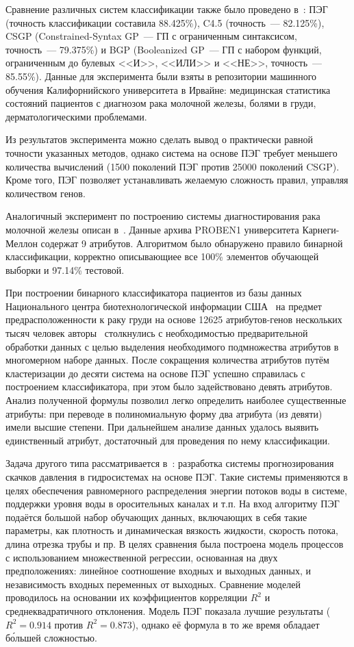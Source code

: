 Сравнение различных систем классификации также было проведено в~\cite{conf/adma/WeinertL06}: ПЭГ (точность классификации составила 88.425\%), {C4.5} (точность~--- 82.125\%), CSGP (Constrained-Syntax GP~--- ГП с ограниченным синтаксисом, точность~--- 79.375\%) и BGP (Booleanized GP~--- ГП с набором функций, ограниченным до булевых <<И>>, <<ИЛИ>> и <<НЕ>>, точность~--- 85.55\%). Данные для эксперимента были взяты в репозитории машинного обучения Калифорнийского университета в Ирвайне: медицинская статистика состояний пациентов с диагнозом рака молочной железы, болями в груди, дерматологическими проблемами.

Из результатов эксперимента можно сделать вывод о практически равной точности указанных методов, однако система на основе ПЭГ требует меньшего количества вычислений (1500 поколений ПЭГ против 25000 поколений CSGP). Кроме того, ПЭГ позволяет устанавливать желаемую сложность правил, управляя количеством генов.

Аналогичный эксперимент по построению системы диагностирования рака молочной железы описан в~\cite{ferreira:2004:rdbic}. Данные архива PROBEN1 университета Карнеги-Меллон содержат 9 атрибутов. Алгоритмом было обнаружено правило бинарной классификации, корректно описывающиее все 100\% элементов обучающей выборки и 97.14\% тестовой.

При построении бинарного классификатора пациентов из базы данных Национального центра биотехнологической информации США~\cite{ncbinlm2006} на предмет предрасположенности к раку груди на основе 12625 атрибутов-генов нескольких тысяч человек авторы~\cite{conf/rskt/ValdesB06} столкнулись с необходимостью предварительной обработки данных с целью выделения необходимого подмножества атрибутов в многомерном наборе данных. После сокращения количества атрибутов путём кластеризации до десяти система на основе ПЭГ успешно справилась с построением классификатора, при этом было задействовано девять атрибутов. Анализ полученной формулы позволил легко определить наиболее существенные атрибуты: при переводе в полиномиальную форму два атрибута (из девяти) имели высшие степени. При дальнейшем анализе данных удалось выявить единственный атрибут, достаточный для проведения по нему классификации.

Задача другого типа рассматривается в~\cite{journals/iajit/EldrandalyN08}: разработка системы прогнозирования скачков давления в гидросистемах на основе ПЭГ. Такие системы применяются в целях обеспечения равномерного распределения энергии потоков воды в системе, поддержки уровня воды в оросительных каналах и т.п. На вход алгоритму ПЭГ подаётся большой набор обучающих данных, включающих в себя такие параметры, как плотность и динамическая вязкость жидкости, скорость потока, длина отрезка трубы и пр. В целях сравнения была построена модель процессов с использованием множественной регрессии, основанная на двух предположениях: линейное соотношение входных и выходных данных, и независимость входных переменных от выходных. Сравнение моделей проводилось на основании их коэффициентов корреляции $R^2$ и среднеквадратичного отклонения. Модель ПЭГ показала лучшие результаты ($R^2=0.914$ против $R^2=0.873$), однако её формула в то же время обладает б\'{о}льшей сложностью.

